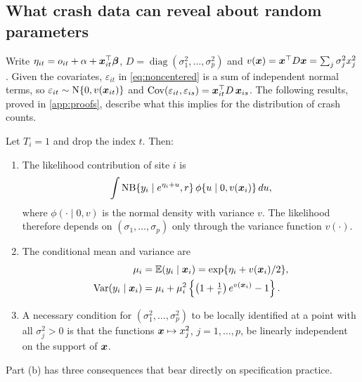 \subsection{What crash data can reveal about random parameters}\label{sec:identification}

Write $\eta_{it}=o_{it}+\alpha+\bm{x}_{it}^\top\bm{\beta}$, $D=\operatorname{diag}(\sigma_1^2,\dots,\sigma_p^2)$ and $v(\bm{x})=\bm{x}^\top D\bm{x}=\sum_j\sigma_j^2x_j^2$. Given the covariates, $\varepsilon_{it}$ in \eqref{eq:noncentered} is a sum of independent normal terms, so $\varepsilon_{it}\sim\mathrm{N}\{0,v(\bm{x}_{it})\}$ and $\operatorname{Cov}(\varepsilon_{it},\varepsilon_{is})=\bm{x}_{it}^\top D\,\bm{x}_{is}$. The following results, proved in \ref{app:proofs}, describe what this implies for the distribution of crash counts.

\begin{proposition}\label{prop:cross}
Let $T_i=1$ and drop the index $t$. Then:
\begin{enumerate}[label=(\alph*)]
\item The likelihood contribution of site $i$ is
\[
\int \mathrm{NB}\{y_i \mid e^{\eta_i+u}, r\}\,\phi\{u \mid 0, v(\bm{x}_i)\}\,du,
\]
where $\phi(\cdot\mid 0,v)$ is the normal density with variance $v$. The likelihood therefore depends on $(\sigma_1,\dots,\sigma_p)$ only through the variance function $v(\cdot)$.
\item The conditional mean and variance are
\begin{equation}\label{eq:moments}
\begin{aligned}
\mu_i&=\mathbb{E}(y_i\mid\bm{x}_i)=\exp\{\eta_i+v(\bm{x}_i)/2\},\\
\operatorname{Var}(y_i\mid\bm{x}_i)&=\mu_i+\mu_i^2\left\{\left(1+\tfrac{1}{r}\right)e^{v(\bm{x}_i)}-1\right\}.
\end{aligned}
\end{equation}
\item A necessary condition for $(\sigma_1^2,\dots,\sigma_p^2)$ to be locally identified at a point with all $\sigma_j^2>0$ is that the functions $\bm{x}\mapsto x_j^2$, $j=1,\dots,p$, be linearly independent on the support of $\bm{x}$.
\end{enumerate}
\end{proposition}

Part (b) has three consequences that bear directly on specification practice.

